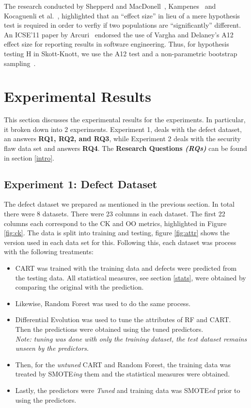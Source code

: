 \documentclass[12pt]{IEEEtran}
\begin{document}
The research conducted by Shepperd and MacDonell~\cite{shepperd12a}, Kampenes~\cite{kampenes07} and Kocaguenli et al.~\cite{kocharm13}, highlighted that an ``effect size'' in lieu of a mere hypothesis test is required in order to verfiy if two populations are ``significantly'' different. An ICSE'11 paper by Arcuri~\cite{arcuri11} endorsed the use of Vargha and Delaney's A12 effect size for reporting results in software engineering. Thus, for hypothesis testing H in Skott-Knott, we use the A12 test and a non-parametric bootstrap sampling~\cite{efron93}.


\section{Experimental Results}

This section discusses the experimental results for the experiments. In particular, it broken down into 2 experiments. Experiment 1, deals with the defect dataset, an answers \textbf{RQ1, RQ2, and RQ3}, while Experiment 2 deals with the security flaw data set and answers \textbf{RQ4}. The \textbf{Research Questions \textit{(RQs)}} can be found in section \ref{intro}.

\subsection*{Experiment 1: Defect Dataset} \label{exp1}

The defect dataset we prepared as mentioned in the previous section. In total there were 8 datasets. There were 23 columns in each dataset. The first 22 columns each correspond to the CK and OO metrics, highlighted in Figure \ref{fig:ck}. The data is split into training and testing, figure \ref{fig:attr} shows the version used in each data set for this. Following this, each dataset was process with the following treatments:
\begin{itemize}
\item CART was trained with the training data and defects were predicted from the testing data. All statistical measures, see section \ref{stats}, were obtained by comparing the original with the prediction.
\item Likewise, Random Forest was used to do the same process.
\item Differential Evolution was used to tune the attributes of RF and CART. Then the predictions were obtained using the tuned predictors. \\ \textit{Note: tuning was done with only the training dataset, the test dataset remains unseen by the predictors.}
\item Then, for the \textit{untuned} CART and Random Forest, the training data was treated by SMOTE\textit{ing} them and the statistical measures were obtained.
\item Lastly, the predictors were \textit{Tuned} and training data was SMOTE\textit{ed} prior to using the predictors.
 
\end{itemize}
\end{document}
